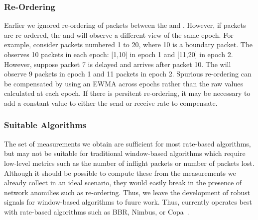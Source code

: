 \subsubsection{Re-Ordering}
\label{s:measure:limitation:reorder}
Earlier we ignored re-ordering of packets between the \inbox and \outbox. However, if packets
are re-ordered, the \inbox and \outbox will observe a different view of the same epoch.
For example, consider packets numbered 1 to 20, where 10 is a boundary packet. The \inbox observes
10 packets in each epoch: [1,10] in epoch 1 and [11,20] in epoch 2. 
However, suppose packet 7 is delayed and arrives after packet 10. The \outbox will observe 9
packets in epoch 1 and 11 packets in epoch 2. 
Spurious re-ordering can be compensated by using an EWMA across epochs rather than the raw values
calculated at each epoch. If there is persitent re-ordering, it may be necessary to add a constant 
value to either the send or receive rate to compensate.

\subsubsection{Suitable Algorithms}
\label{s:measure:limitation:algs}
The set of measurements we obtain are sufficient for most rate-based algorithms, but may not be 
suitable for traditional window-based algorithms which require low-level metrics such as 
the number of inflight packets or number of packets lost. Although it should be possible
to compute these from the measurements we already collect in an ideal scenario, they would easily
break in the presence of network anomilies such as re-ordering. Thus, we leave the development
of robust signals for window-based algorithms to fuure work. 
Thus, \name currently operates best with rate-based algorithms such as BBR, Nimbus, or Copa~\cite{bbr,nimbus,copa}.
